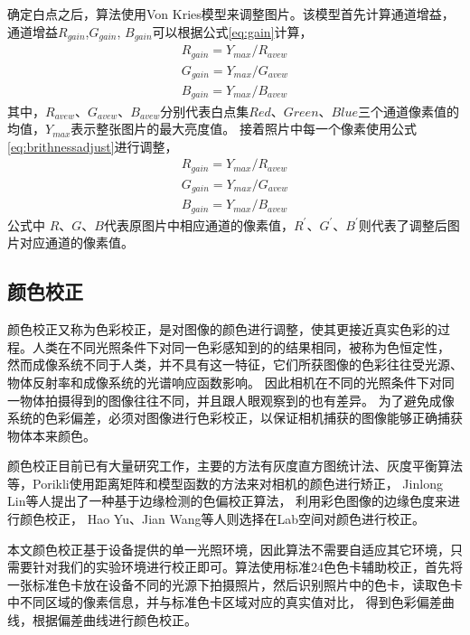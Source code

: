 确定白点之后，算法使用Von Kries模型\cite{macadam1970sources}来调整图片。该模型首先计算通道增益，通道增益$R_{gain}$,$ G_{gain}$, $B_{gain}$可以根据公式\eqref{eq:gain}计算，
\begin{equation}\label{eq:gain}
\begin{split}
R_{gain}=Y_{max}/R_{avew}\\
G_{gain}=Y_{max}/G_{avew}\\
B_{gain}=Y_{max}/B_{avew}
\end{split}
\end{equation}
其中，$R_{avew}$、$G_{avew}$、$B_{avew}$分别代表白点集$Red$、$Green$、$Blue$三个通道像素值的均值，$Y_{max}$表示整张图片的最大亮度值。
接着照片中每一个像素使用公式\eqref{eq:brithnessadjust}进行调整，
\begin{equation}\label{eq:brithnessadjust}
\begin{split}
R_{gain}=Y_{max}/R_{avew}\\
G_{gain}=Y_{max}/G_{avew}\\
B_{gain}=Y_{max}/B_{avew}
\end{split}
\end{equation}
公式中 $R$、$G$、$B$代表原图片中相应通道的像素值，$R^{'}$、$G^{'}$、$B^{'}$则代表了调整后图片对应通道的像素值。

\subsection{颜色校正}


颜色校正又称为色彩校正，是对图像的颜色进行调整，使其更接近真实色彩的过程。人类在不同光照条件下对同一色彩感知到的的结果相同，被称为色恒定性，
然而成像系统不同于人类，并不具有这一特征，它们所获图像的色彩往往受光源、物体反射率和成像系统的光谱响应函数影响。
因此相机在不同的光照条件下对同一物体拍摄得到的图像往往不同，并且跟人眼观察到的也有差异。
为了避免成像系统的色彩偏差，必须对图像进行色彩校正，以保证相机捕获的图像能够正确捕获物体本来颜色。

颜色校正目前已有大量研究工作，主要的方法有灰度直方图统计法、灰度平衡算法等，Porikli\cite{weng2005novel}使用距离矩阵和模型函数的方法来对相机的颜色进行矫正，
Jinlong Lin\cite{porikli2003inter}等人提出了一种基于边缘检测的色偏校正算法，
利用彩色图像的边缘色度来进行颜色校正，
Hao Yu、Jian Wang\cite{yu2009color}等人则选择在Lab空间对颜色进行校正。

本文颜色校正基于设备提供的单一光照环境，因此算法不需要自适应其它环境，只需要针对我们的实验环境进行校正即可。算法使用标准24色色卡辅助校正，首先将一张标准色卡放在设备不同的光源下拍摄照片，然后识别照片中的色卡，读取色卡中不同区域的像素信息，并与标准色卡区域对应的真实值对比，
得到色彩偏差曲线，根据偏差曲线进行颜色校正。

